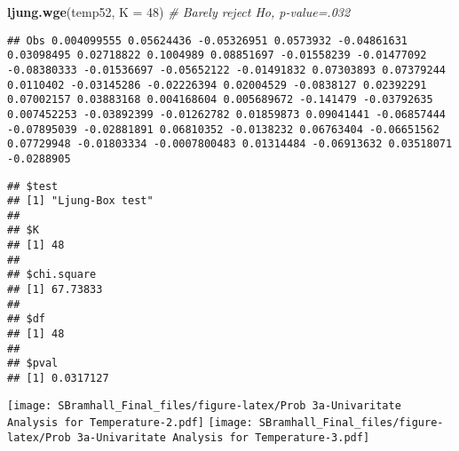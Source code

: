 \documentclass[]{article}
\newenvironment{Shaded}{\begin{snugshade}}{\end{snugshade}}
\newcommand{\KeywordTok}[1]{\textcolor[rgb]{0.13,0.29,0.53}{\textbf{#1}}}
\newcommand{\DataTypeTok}[1]{\textcolor[rgb]{0.13,0.29,0.53}{#1}}
\newcommand{\DecValTok}[1]{\textcolor[rgb]{0.00,0.00,0.81}{#1}}
\newcommand{\StringTok}[1]{\textcolor[rgb]{0.31,0.60,0.02}{#1}}
\newcommand{\CommentTok}[1]{\textcolor[rgb]{0.56,0.35,0.01}{\textit{#1}}}
\newcommand{\OperatorTok}[1]{\textcolor[rgb]{0.81,0.36,0.00}{\textbf{#1}}}
\newcommand{\NormalTok}[1]{#1}
\begin{document}
\begin{Shaded}
\begin{Highlighting}[]
\KeywordTok{ljung.wge}\NormalTok{(temp52, }\DataTypeTok{K =} \DecValTok{48}\NormalTok{)                           }\CommentTok{# Barely reject Ho, p-value=.032}
\end{Highlighting}
\end{Shaded}

\begin{verbatim}
## Obs 0.004099555 0.05624436 -0.05326951 0.0573932 -0.04861631 0.03098495 0.02718822 0.1004989 0.08851697 -0.01558239 -0.01477092 -0.08380333 -0.01536697 -0.05652122 -0.01491832 0.07303893 0.07379244 0.0110402 -0.03145286 -0.02226394 0.02004529 -0.0838127 0.02392291 0.07002157 0.03883168 0.004168604 0.005689672 -0.141479 -0.03792635 0.007452253 -0.03892399 -0.01262782 0.01859873 0.09041441 -0.06857444 -0.07895039 -0.02881891 0.06810352 -0.0138232 0.06763404 -0.06651562 0.07729948 -0.01803334 -0.0007800483 0.01314484 -0.06913632 0.03518071 -0.0288905
\end{verbatim}

\begin{verbatim}
## $test
## [1] "Ljung-Box test"
## 
## $K
## [1] 48
## 
## $chi.square
## [1] 67.73833
## 
## $df
## [1] 48
## 
## $pval
## [1] 0.0317127
\end{verbatim}

\begin{Shaded}
\end{Shaded}

\texttt{[image: SBramhall\_Final\_files/figure-latex/Prob 3a-Univaritate Analysis for Temperature-2.pdf]}
\texttt{[image: SBramhall\_Final\_files/figure-latex/Prob 3a-Univaritate Analysis for Temperature-3.pdf]}
\end{document}
